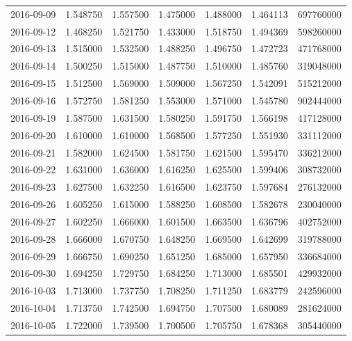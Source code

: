 \begin{tabular}{lrrrrrr}
2016-09-09 &    1.548750 &    1.557500 &    1.475000 &    1.488000 &    1.464113 &   697760000 \\
2016-09-12 &    1.468250 &    1.521750 &    1.433000 &    1.518750 &    1.494369 &   598260000 \\
2016-09-13 &    1.515000 &    1.532500 &    1.488250 &    1.496750 &    1.472723 &   471768000 \\
2016-09-14 &    1.500250 &    1.515000 &    1.487750 &    1.510000 &    1.485760 &   319048000 \\
2016-09-15 &    1.512500 &    1.569000 &    1.509000 &    1.567250 &    1.542091 &   515212000 \\
2016-09-16 &    1.572750 &    1.581250 &    1.553000 &    1.571000 &    1.545780 &   902444000 \\
2016-09-19 &    1.587500 &    1.631500 &    1.580250 &    1.591750 &    1.566198 &   417128000 \\
2016-09-20 &    1.610000 &    1.610000 &    1.568500 &    1.577250 &    1.551930 &   331112000 \\
2016-09-21 &    1.582000 &    1.624500 &    1.581750 &    1.621500 &    1.595470 &   336212000 \\
2016-09-22 &    1.631000 &    1.636000 &    1.616250 &    1.625500 &    1.599406 &   308732000 \\
2016-09-23 &    1.627500 &    1.632250 &    1.616500 &    1.623750 &    1.597684 &   276132000 \\
2016-09-26 &    1.605250 &    1.615000 &    1.588250 &    1.608500 &    1.582678 &   230040000 \\
2016-09-27 &    1.602250 &    1.666000 &    1.601500 &    1.663500 &    1.636796 &   402752000 \\
2016-09-28 &    1.666000 &    1.670750 &    1.648250 &    1.669500 &    1.642699 &   319788000 \\
2016-09-29 &    1.666750 &    1.690250 &    1.651250 &    1.685000 &    1.657950 &   336684000 \\
2016-09-30 &    1.694250 &    1.729750 &    1.684250 &    1.713000 &    1.685501 &   429932000 \\
2016-10-03 &    1.713000 &    1.737750 &    1.708250 &    1.711250 &    1.683779 &   242596000 \\
2016-10-04 &    1.713750 &    1.742500 &    1.694750 &    1.707500 &    1.680089 &   281624000 \\
2016-10-05 &    1.722000 &    1.739500 &    1.700500 &    1.705750 &    1.678368 &   305440000 \\

\end{tabular}
